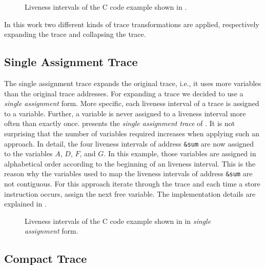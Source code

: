 \documentclass[onecolumn, openright, master, english, signatures]{dbrgrptt}
\begin{document}
\begin{figure}[!ht]
  \centering
  
  \caption{Liveness intervals of the C code example shown in .}
  \label{fig:trace-transformation-original}
\end{figure}

In this work two different kinds of \ac{trace} transformations are applied, respectively expanding the \ac{trace} and collapsing the \ac{trace}.

\subsection{Single Assignment Trace}

The single assignment trace expands the original \ac{trace}, i.e., it uses more variables than the original \ac{trace} addresses.
For expanding a \ac{trace} we decided to use a \emph{single assignment} form.
More specific, each liveness interval of a \ac{trace} is assigned to a variable.
Further, a variable is never assigned to a liveness interval more often than exactly once.
 presents the \emph{single assignment trace} of .
It is not surprising that the number of variables required increases when applying such an approach.
In detail, the four liveness intervals of address \texttt{\&sum} are now assigned to the variables $A$, $D$, $F$, and $G$.
In this example, those variables are assigned in alphabetical order according to the beginning of an liveness interval.
This is the reason why the variables used to map the liveness intervals of address \texttt{\&sum} are not contiguous.
For this approach iterate through the \ac{trace} and each time a store instruction occurs, assign the next free variable.
The implementation details are explained in .

\begin{figure}[!ht]
  \centering
  
  \caption{Liveness intervals of the C code example shown in  in \emph{single assignment} form.}
  \label{fig:trace-transformation-sa}
\end{figure}

\subsection{Compact Trace}
\end{document}
